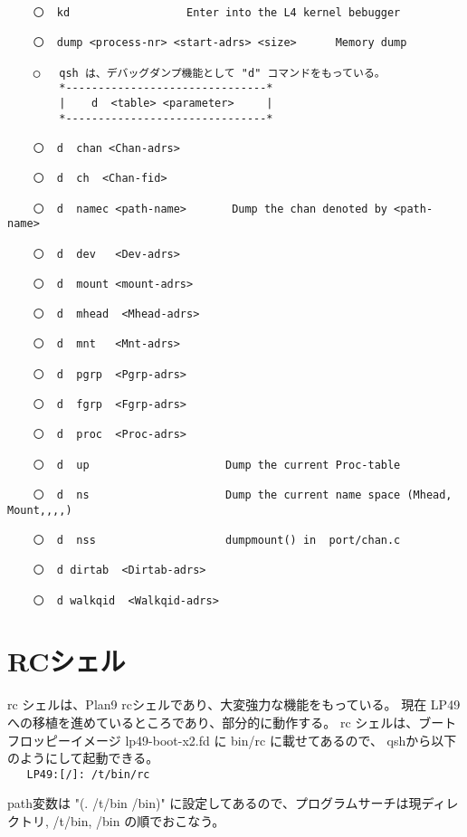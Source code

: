 \begin{verbatim}   
    〇  kd                  Enter into the L4 kernel bebugger

    〇  dump <process-nr> <start-adrs> <size>      Memory dump  
    
    ◯   qsh は、デバッグダンプ機能として "d" コマンドをもっている。
        *-------------------------------*
        |    d  <table> <parameter>     |
        *-------------------------------*

    〇  d  chan <Chan-adrs> 

    〇  d  ch  <Chan-fid> 

    〇  d  namec <path-name>       Dump the chan denoted by <path-name>

    〇  d  dev   <Dev-adrs> 

    〇  d  mount <mount-adrs>  

    〇  d  mhead  <Mhead-adrs> 	

    〇  d  mnt	<Mnt-adrs> 

    〇  d  pgrp  <Pgrp-adrs> 

    〇  d  fgrp  <Fgrp-adrs> 

    〇  d  proc  <Proc-adrs>  

    〇  d  up                     Dump the current Proc-table

    〇  d  ns                     Dump the current name space (Mhead, Mount,,,,) 

    〇  d  nss                    dumpmount() in  port/chan.c 

    〇  d dirtab  <Dirtab-adrs> 

    〇  d walkqid  <Walkqid-adrs>  
\end{verbatim}   



\chapter{RCシェル}

      rc シェルは、Plan9 rcシェルであり、大変強力な機能をもっている。
     現在 LP49 への移植を進めているところであり、部分的に動作する。
      rc シェルは、ブートフロッピーイメージ lp49-boot-x2.fd に bin/rc に載せてあるので、
     qshから以下のようにして起動できる。\\

     \verb|   LP49:[/]: /t/bin/rc   |
    
      path変数は "(. /t/bin /bin)" に設定してあるので、プログラムサーチは現ディレクトリ, 
     /t/bin, /bin の順でおこなう。\\


